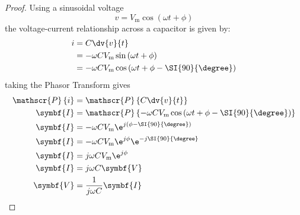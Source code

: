 \documentclass{article}
\begin{document}
\begin{proof}
    Using a sinusoidal voltage
    \begin{equation*}
        v = V_{\mathrm{m}}\cos{\left( \omega t + \phi \right)}
    \end{equation*}
    the voltage-current relationship across a capacitor is given by:
    \begin{align*}
        i & = C \dv{v}{t}                                                                      \\
        & = -\omega C V_{\mathrm{m}} \sin{\left( \omega t + \phi \right)}                    \\
        & = -\omega C V_{\mathrm{m}} \cos{\left( \omega t + \phi - \SI{90}{\degree} \right)}
    \end{align*}
    taking the Phasor Transform gives
    \begin{align*}
        \mathscr{P}\left\{ i \right\} & = \mathscr{P}\left\{ C \dv{v}{t} \right\}                                                                      \\
        \symbf{I}                     & = \mathscr{P}\left\{ -\omega C V_{\mathrm{m}} \cos{\left( \omega t + \phi - \SI{90}{\degree} \right)} \right\} \\
        \symbf{I}                     & = -\omega C V_{\mathrm{m}} \e^{j\left( \phi - \SI{90}{\degree} \right)}                                        \\
        \symbf{I}                     & = -\omega C V_{\mathrm{m}} \e^{j \phi} \e^{-j\SI{90}{\degree}}                                                 \\
        \symbf{I}                     & = j\omega C V_{\mathrm{m}} \e^{j \phi}                                                                         \\
        \symbf{I}                     & = j\omega C \symbf{V}                                                                                          \\
        \symbf{V}                     & = \frac{1}{j\omega C} \symbf{I}
    \end{align*}
\end{proof}
\end{document}
